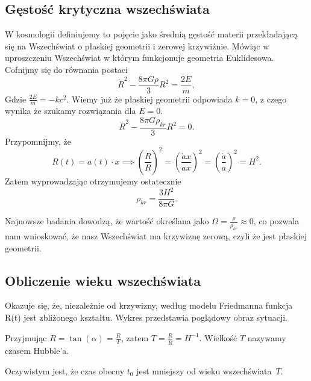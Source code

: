 \documentclass[12pt]{article}
\begin{document}
	\subsection{Gęstość krytyczna wszechświata}
	W kosmologii definiujemy to pojęcie jako średnią gęstość materii przekładającą się na Wszechświat o płaskiej geometrii i zerowej krzywiźnie. Mówiąc w uproszczeniu Wszechświat w którym funkcjonuje geometria Euklidesowa.
	\\
	Cofnijmy się do równania postaci
	\begin{equation}
		\dot{R}^2 - \frac{8 \pi G \rho}{3} R^2 = \frac{2E}{m},
	\end{equation}
	Gdzie $\frac{2E}{m} = - k c^2 $. Wiemy już że płaskiej geometrii odpowiada $k = 0$, z czego wynika że szukamy rozwiązania dla $E = 0$.
	\begin{equation}
		\dot{R}^2 - \frac{8 \pi G \rho_{kr} }{3} R^2 = 0.
	\end{equation}
	Przypomnijmy, że
	\begin{equation}
		R(t) = a(t)\cdot x \implies \left(\frac{\dot{R}}{R}\right)^{2} = \left(\frac{\dot{a } x}{a x}\right)^{2} = \left(\frac{\dot{a } }{a }\right)^{2}= H^2.
	\end{equation}
	Zatem wyprowadzając otrzymujemy ostatecznie
	\begin{equation}
		\rho_{kr} = \frac{3 H^2}{8 \pi G}.
	\end{equation}
	
	Najnowsze badania\cite{Parameters} dowodzą, że wartość określana jako $\Omega = \frac{\rho}{\rho_{kr}} \approx 0$, co pozwala nam wnioskować, że nasz Wszechświat ma krzywiznę zerową, czyli że jest płaskiej geometrii.  
	
	
	\subsection{Obliczenie wieku wszechświata}
	Okazuje się, że, niezależnie od krzywizny, według modelu Friedmanna funkcja R(t) jest zbliżonego kształtu. Wykres przedstawia poglądowy obraz sytuacji.	
	
	\begin{center}
	\end{center}
	
	Przyjmując $\dot{R} = \tan(\alpha) = \frac{R}{T}$, zatem $T = \frac{R}{\dot{R}} = H^{-1}$. Wielkość $T$ nazywamy czasem Hubble'a.
	
	Oczywistym jest, że czas obecny $t_{0}$ jest mniejszy od wieku wszechświata~$T$.
	
\end{document}
